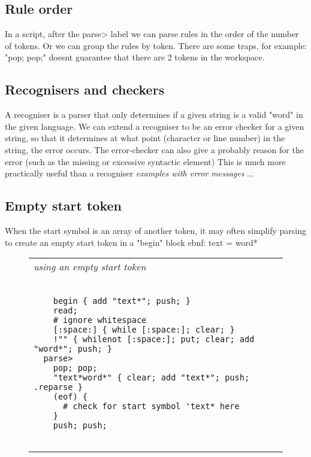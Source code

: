 \documentclass[a4paper,12pt]{article}
\begin{document}
\subsection{Rule order}

  In a script, after the parse> label we can parse rules in the
  order of the number of tokens. Or we can group the rules by
  token. There are some traps, for example: "pop; pop;" doesnt
  guarantee that there are 2 tokens in the workspace.

\subsection{Recognisers and checkers}

  A recogniser is a parser that only determines if a given string is a valid
  "word" in the given language. We can extend a recogniser to be an error
  checker for a given string, so that it determines at what point (character
  or line number) in the string, the error occurs. The error-checker can also
  give a probably reason for the error (such as the missing or excessive
  syntactic element) This is much more practically useful than a recogniser
 \emph{ examples with error messages }
  ...

\subsection{Empty start token}

  When the start symbol is an array of another token, it may often
  simplify parsing to create an empty start token in a "begin" block
  ebnf: text = word*
 \begin{figure}
 \begin{tabular}{ l }
 \emph{ using an empty start token } \\ 
 \begin{lstlisting}[breaklines] 

    begin { add "text*"; push; }
    read;
    # ignore whitespace
    [:space:] { while [:space:]; clear; }
    !"" { whilenot [:space:]; put; clear; add "word*"; push; }
  parse>
    pop; pop;
    "text*word*" { clear; add "text*"; push; .reparse }  
    (eof) { 
      # check for start symbol 'text* here
    }
    push; push; 
  
 \end{lstlisting} 
 \end{tabular} 

 \end{figure}
\end{document}
